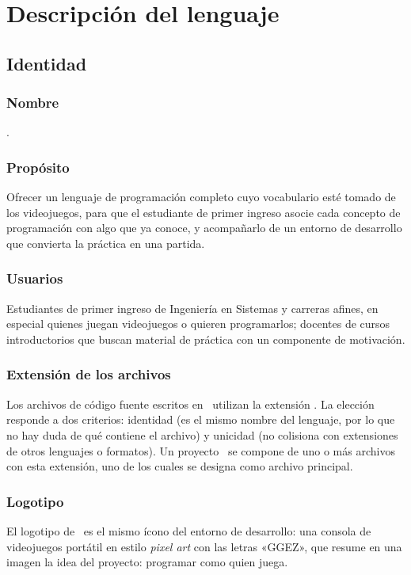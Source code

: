 \section{Descripción del lenguaje}

\subsection{Identidad}

\subsubsection*{Nombre}
\ggez.

\subsubsection*{Propósito}
Ofrecer un lenguaje de programación completo cuyo vocabulario esté tomado de los videojuegos, para que el estudiante de primer ingreso asocie cada concepto de programación con algo que ya conoce, y acompañarlo de un entorno de desarrollo que convierta la práctica en una partida.

\subsubsection*{Usuarios}
Estudiantes de primer ingreso de Ingeniería en Sistemas y carreras afines, en especial quienes juegan videojuegos o quieren programarlos; docentes de cursos introductorios que buscan material de práctica con un componente de motivación.

\subsubsection*{Extensión de los archivos}
Los archivos de código fuente escritos en \ggez\ utilizan la extensión . La elección responde a dos criterios: identidad (es el mismo nombre del lenguaje, por lo que no hay duda de qué contiene el archivo) y unicidad (no colisiona con extensiones de otros lenguajes o formatos). Un proyecto \ggez\ se compone de uno o más archivos con esta extensión, uno de los cuales se designa como archivo principal.

\subsubsection*{Logotipo}
El logotipo de \ggez\ es el mismo ícono del entorno de desarrollo: una consola de videojuegos portátil en estilo \emph{pixel art} con las letras «GGEZ», que resume en una imagen la idea del proyecto: programar como quien juega.

